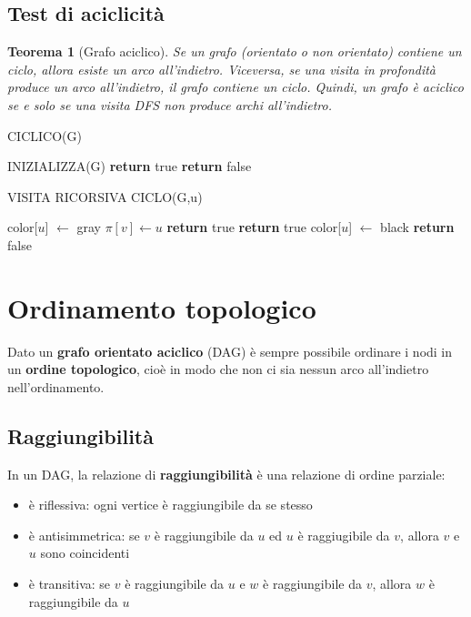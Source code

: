 \documentclass[11pt]{article}
\newtheorem*{theorem}{Teorema}
\begin{document}
\subsection{Test di aciclicità}
\begin{theorem}[Grafo aciclico]
    Se un grafo (orientato o non orientato) contiene un ciclo, allora esiste un arco all'indietro. Viceversa, se una visita 
    in profondità produce un arco all'indietro, il grafo contiene un ciclo. Quindi, un grafo è aciclico se e solo se una 
    visita DFS non produce archi all'indietro.
\end{theorem} 
\begin{algorithm}[H]
    \caption{CICLICO(G)}
    \begin{algorithmic}
        \State INIZIALIZZA(G)
                \State \textbf{return} true
            \EndIf 
        \EndFor
        \State \textbf{return} false
    \end{algorithmic}
\end{algorithm}
\begin{algorithm}[H]
    \caption{VISITA RICORSIVA CICLO(G,u)}
    \begin{algorithmic}
        \State color[$u$] $\gets$ gray
                \State $\pi[v] \gets u$
                    \State \textbf{return} true
                \EndIf
                    \State \textbf{return} true
            \EndIf 
        \EndFor 
        \State color[$u$] $\gets$ black 
        \State \textbf{return} false
    \end{algorithmic}
\end{algorithm}
\section{Ordinamento topologico}
Dato un \textbf{grafo orientato aciclico} (DAG) è sempre possibile ordinare i nodi in un \textbf{ordine topologico}, cioè 
in modo che non ci sia nessun arco all'indietro nell'ordinamento.
\subsection{Raggiungibilità}
In un DAG, la relazione di \textbf{raggiungibilità} è una relazione di ordine parziale:
\begin{itemize}
    \item è riflessiva: ogni vertice è raggiungibile da se stesso 
    \item è antisimmetrica: se $v$ è raggiungibile da $u$ ed $u$ è raggiugibile da $v$, allora $v$ e $u$ sono coincidenti
    \item è transitiva: se $v$ è raggiungibile da $u$ e $w$ è raggiungibile da $v$, allora $w$ è raggiungibile da $u$
\end{itemize}
\end{document}

